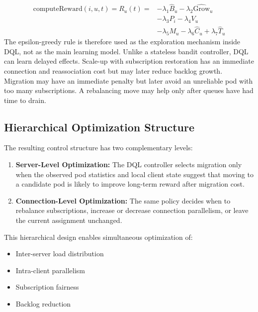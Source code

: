 \documentclass[manuscript,nonacm]{acmart}
\begin{document}
\begin{align}
	\text{computeReward}(i,u,t)=R_u(t) =
	&-\lambda_1\widehat{B}_u
	-\lambda_2\widehat{\mathrm{Grow}}_u \nonumber\\
	&-\lambda_3 P_i
	-\lambda_4 V_u \nonumber\\
	&-\lambda_5 M_u
	-\lambda_6\widehat{C}_u
	+\lambda_7\widehat{T}_u
	\label{eq:reward_function}
\end{align}
The epsilon-greedy rule is therefore used as the exploration mechanism inside
DQL, not as the main learning model. Unlike a stateless bandit controller, DQL
can learn delayed effects. Scale-up with subscription restoration has an
immediate connection and reassociation cost but may later reduce backlog growth.
Migration may have an immediate penalty but later avoid an unreliable pod with
too many subscriptions. A rebalancing move may help only after queues have had
time to drain.



\subsection{Hierarchical Optimization Structure}

The resulting control structure has two complementary levels:

\begin{enumerate}
	
	\item \textbf{Server-Level Optimization:}
	The DQL controller selects migration only when the observed pod statistics
	and local client state suggest that moving to a candidate pod is likely to
	improve long-term reward after migration cost.
	
	\item \textbf{Connection-Level Optimization:}
	The same policy decides when to rebalance subscriptions, increase or
	decrease connection parallelism, or leave the current assignment unchanged.
	
\end{enumerate}

This hierarchical design enables simultaneous optimization of:

\begin{itemize}
	\item Inter-server load distribution
	\item Intra-client parallelism
	\item Subscription fairness
	\item Backlog reduction
\end{itemize}
\end{document}
